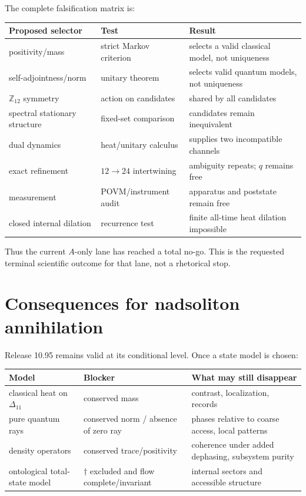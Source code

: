 \documentclass[11pt,a4paper]{article}
\newcommand{\Dclass}{\Delta_{11}}
\begin{document}
The complete falsification matrix is:
\begin{longtable}{@{}p{}p{}p{}@{}}
\toprule
Proposed selector & Test & Result \\
\midrule\endhead
positivity/mass & strict Markov criterion & selects a valid classical model, not uniqueness \\
self-adjointness/norm & unitary theorem & selects valid quantum models, not uniqueness \\
$\mathbb Z_{12}$ symmetry & action on candidates & shared by all candidates \\
spectral stationary structure & fixed-set comparison & candidates remain inequivalent \\
dual dynamics & heat/unitary calculus & supplies two incompatible channels \\
exact refinement & $12\to24$ intertwining & ambiguity repeats; $q$ remains free \\
measurement & POVM/instrument audit & apparatus and poststate remain free \\
closed internal dilation & recurrence test & finite all-time heat dilation impossible \\
\bottomrule
\end{longtable}

Thus the current $A$-only lane has reached a total no-go.  This is the requested
terminal scientific outcome for that lane, not a rhetorical stop.

\section{Consequences for nadsoliton annihilation}

Release 10.95 remains valid at its conditional level.  Once a state model is
chosen:
\begin{longtable}{@{}p{}p{}p{}@{}}
\toprule
Model & Blocker & What may still disappear \\
\midrule\endhead
classical heat on $\Dclass$ & conserved mass & contrast, localization, records \\
pure quantum rays & conserved norm / absence of zero ray & phases relative to coarse access, local patterns \\
density operators & conserved trace/positivity & coherence under added dephasing, subsystem purity \\
ontological total-state model & $\dagger$ excluded and flow complete/invariant & internal sectors and accessible structure \\
\bottomrule
\end{longtable}
\end{document}
